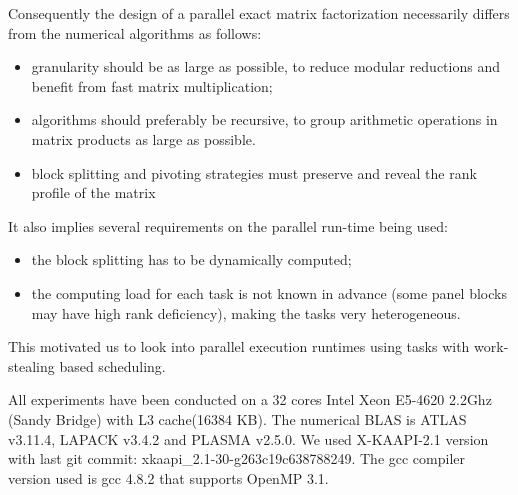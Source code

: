 \documentclass{article}
\begin{document}
 
 
 
 
 

 
 
 
 
 
 
 
 
 
 
 
 
 
 
 
 

 
 
 
 
 
 
 
 
 

Consequently the design of a parallel exact matrix factorization 
 necessarily differs from the numerical algorithms as follows:
\vspace{-3mm}
\begin{itemize}
\item granularity should be as large as possible, to reduce modular reductions
  and benefit from fast matrix multiplication;
\item algorithms should preferably be recursive, to group arithmetic operations
  in matrix products as large as possible.
\item block splitting and pivoting strategies must preserve and reveal the rank
  profile of the matrix
\end{itemize}
\vspace{-2mm}
It also implies several requirements on the parallel run-time being used:
\vspace{-3mm}
\begin{itemize}
\item the block splitting has to be dynamically computed;
\item the computing load for each task is not known in advance (some panel
  blocks may have high rank deficiency), making the tasks very heterogeneous.
\end{itemize}
\vspace{-2mm}
 

This motivated us to look into parallel execution runtimes using tasks with work-stealing based
scheduling. 
 
 
 
 
 
 
 

 

All experiments have been conducted on a 32 cores Intel Xeon E5-4620 2.2Ghz
(Sandy Bridge) with L3 cache(16384 KB). The numerical BLAS is ATLAS v3.11.4,
LAPACK v3.4.2 and PLASMA v2.5.0. We used X-KAAPI-2.1 version with last git commit:
xkaapi\_2.1-30-g263c19c638788249. The gcc compiler version used is gcc 4.8.2 that
supports OpenMP 3.1.
 
\end{document}
